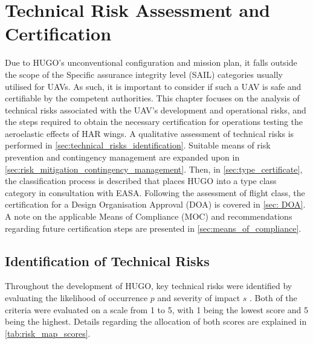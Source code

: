 \chapter{Technical Risk Assessment and Certification}
\label{ch:risk_assessment}

Due to HUGO's unconventional configuration and mission plan, it falls outside the scope of the Specific assurance integrity level (SAIL) categories usually utilised for UAVs. As such, it is important to consider if such a UAV is safe and certifiable by the competent authorities. This chapter focuses on the analysis of technical risks associated with the UAV's development and operational risks, and the steps required to obtain the necessary certification for operations testing the aeroelastic effects of HAR wings. A qualitative assessment of technical risks is performed in \autoref{sec:technical_risks_identification}. Suitable means of risk prevention and contingency management are expanded upon in \autoref{sec:risk_mitigation_contingency_management}. Then, in \autoref{sec:type_certificate}, the classification process is described that places HUGO into a type class category in consultation with EASA. Following the assessment of flight class, the certification for a Design Organisation Approval (DOA) is covered in \autoref{sec: DOA}. A note on the applicable Means of Compliance (MOC) and recommendations regarding future certification steps are presented in \autoref{sec:means_of_compliance}.


\section{Identification of Technical Risks}
\label{sec:technical_risks_identification}
Throughout the development of HUGO, key technical risks were identified by evaluating the likelihood of occurrence $p$ and severity of impact $s$ \cite{Lanzafame2024}. Both of the criteria were evaluated on a scale from 1 to 5, with 1 being the lowest score and 5 being the highest. Details regarding the allocation of both scores are explained in \autoref{tab:risk_map_scores}.

